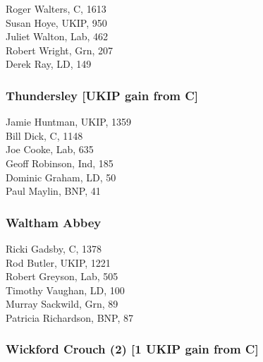 \documentclass[a4paper,openany,10pt]{book}
\begin{document}


Roger Walters, C, 1613\\
Susan Hoye, UKIP, 950\\
Juliet Walton, Lab, 462\\
Robert Wright, Grn, 207\\
Derek Ray, LD, 149\\


\subsubsection*{Thundersley \hspace*{\fill}\nolinebreak[1]%
\enspace\hspace*{\fill}
[UKIP gain from C]}



Jamie Huntman, UKIP, 1359\\
Bill Dick, C, 1148\\
Joe Cooke, Lab, 635\\
Geoff Robinson, Ind, 185\\
Dominic Graham, LD, 50\\
Paul Maylin, BNP, 41\\


\subsubsection*{Waltham Abbey}



Ricki Gadsby, C, 1378\\
Rod Butler, UKIP, 1221\\
Robert Greyson, Lab, 505\\
Timothy Vaughan, LD, 100\\
Murray Sackwild, Grn, 89\\
Patricia Richardson, BNP, 87\\


\subsubsection*{Wickford Crouch (2) \hspace*{\fill}\nolinebreak[1]%
\enspace\hspace*{\fill}
[1 UKIP gain from C]}
\end{document}
